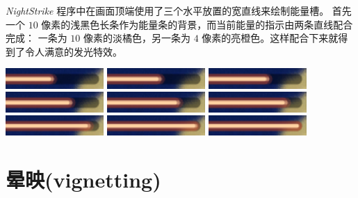 \documentclass[10pt]{book}
\begin{document}
\begin{CJK}{UTF8}{gkai}
\textit{NightStrike} 程序中在画面顶端使用了三个水平放置的宽直线来绘制能量槽。
首先一个 $10$ 像素的浅黑色长条作为能量条的背景，而当前能量的指示由两条直线配合完成：
一条为 $10$ 像素的淡橘色，另一条为 $4$ 像素的亮橙色。这样配合下来就得到了令人满意的发光特效。

\begin{center}
\includegraphics[width=0.28\textwidth]{assets/ns-pwr-0000.png}
\includegraphics[width=0.28\textwidth]{assets/ns-pwr-0001.png}
\includegraphics[width=0.28\textwidth]{assets/ns-pwr-0002.png}
\includegraphics[width=0.28\textwidth]{assets/ns-pwr-0003.png}
\includegraphics[width=0.28\textwidth]{assets/ns-pwr-0004.png}
\includegraphics[width=0.28\textwidth]{assets/ns-pwr-0005.png}
\includegraphics[width=0.28\textwidth]{assets/ns-pwr-0006.png}
\includegraphics[width=0.28\textwidth]{assets/ns-pwr-0007.png}
\includegraphics[width=0.28\textwidth]{assets/ns-pwr-0008.png}
\end{center}

\newpage
\section{晕映(vignetting)}


\end{CJK}
\end{document}
